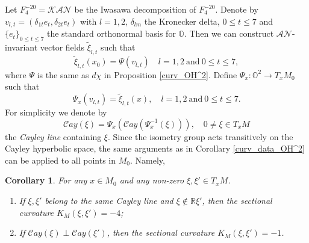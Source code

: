 \documentclass{article}
\newcommand{\OO}{\mathbb{O}}
\newcommand{\RR}{\mathbb{R}}
\newcommand{\cA}{\mathcal{A}}
\newcommand{\cK}{\mathcal{K}}
\newcommand{\cN}{\mathcal{N}}
\newcommand{\Cay}{\mathcal{C}ay}
\newtheorem{cor}[thm]{Corollary}
\theoremstyle{definition}
\begin{document}
Let $F_4^{-20}=\cK\cA\cN$ be the Iwasawa decomposition of $F_4^{-20}$. Denote by $v_{l,t}=(\delta_{1t}e_t,\delta_{2t}e_t)$ with $l=1,2$, $\delta_{lm}$ the Kronecker delta, $0\leq t\leq 7$ and $\{e_t\}_{0\leq t\leq7}$ the standard orthonormal basis for $\OO$. Then we can construct $\cA\cN$-invariant vector fields $\widetilde\xi_{l,t}$ such that  
$$\widetilde\xi_{l,t}(x_0)=\Psi(v_{l,t})\quad l=1,2\mathrm{~and~}0\leq t\leq 7,$$
where $\Psi$ is the same as $d\chi$ in Proposition \ref{curv_OH^2}. Define $\Psi_{x}:\OO^2\to T_xM_0$ such that
$$\Psi_{x}(v_{l,t})=\widetilde\xi_{l,t}(x),\quad l=1,2\mathrm{~and~}0\leq t\leq7.$$
For simplicity we denote by
$$\Cay(\xi)=\Psi_{x}\left(\Cay(\Psi_{x}^{-1}(\xi))\right),\quad0\neq\xi\in T_xM$$
the \emph{Cayley line} containing $\xi$. Since the isometry group acts transitively on the Cayley hyperbolic space, the same arguments as in Corollary \ref{curv_data_OH^2} can be applied to all points in $M_0$. Namely,
\begin{cor}\label{curv_data_general}
For any $x\in M_0$ and any non-zero $\xi,\xi'\in T_{x}M$.
\begin{enumerate}
\item[(1).] If $\xi,\xi'$ belong to the same Cayley line and $\xi\not\in\RR \xi'$, then the sectional curvature $K_{M}(\xi,\xi')=-4$;
\item[(2).] If $\Cay(\xi)\perp\Cay(\xi')$, then the sectional curvature $K_{M}(\xi,\xi')=-1$.
\end{enumerate}
\end{cor}
\end{document}
